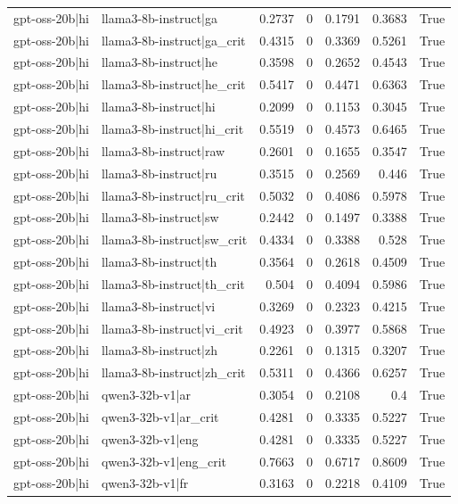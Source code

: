 \begin{table}
\begin{tabular}{l l r r r r l}
gpt-oss-20b|hi & llama3-8b-instruct|ga & 0.2737 & 0 & 0.1791 & 0.3683 & True \\
gpt-oss-20b|hi & llama3-8b-instruct|ga_crit & 0.4315 & 0 & 0.3369 & 0.5261 & True \\
gpt-oss-20b|hi & llama3-8b-instruct|he & 0.3598 & 0 & 0.2652 & 0.4543 & True \\
gpt-oss-20b|hi & llama3-8b-instruct|he_crit & 0.5417 & 0 & 0.4471 & 0.6363 & True \\
gpt-oss-20b|hi & llama3-8b-instruct|hi & 0.2099 & 0 & 0.1153 & 0.3045 & True \\
gpt-oss-20b|hi & llama3-8b-instruct|hi_crit & 0.5519 & 0 & 0.4573 & 0.6465 & True \\
gpt-oss-20b|hi & llama3-8b-instruct|raw & 0.2601 & 0 & 0.1655 & 0.3547 & True \\
gpt-oss-20b|hi & llama3-8b-instruct|ru & 0.3515 & 0 & 0.2569 & 0.446 & True \\
gpt-oss-20b|hi & llama3-8b-instruct|ru_crit & 0.5032 & 0 & 0.4086 & 0.5978 & True \\
gpt-oss-20b|hi & llama3-8b-instruct|sw & 0.2442 & 0 & 0.1497 & 0.3388 & True \\
gpt-oss-20b|hi & llama3-8b-instruct|sw_crit & 0.4334 & 0 & 0.3388 & 0.528 & True \\
gpt-oss-20b|hi & llama3-8b-instruct|th & 0.3564 & 0 & 0.2618 & 0.4509 & True \\
gpt-oss-20b|hi & llama3-8b-instruct|th_crit & 0.504 & 0 & 0.4094 & 0.5986 & True \\
gpt-oss-20b|hi & llama3-8b-instruct|vi & 0.3269 & 0 & 0.2323 & 0.4215 & True \\
gpt-oss-20b|hi & llama3-8b-instruct|vi_crit & 0.4923 & 0 & 0.3977 & 0.5868 & True \\
gpt-oss-20b|hi & llama3-8b-instruct|zh & 0.2261 & 0 & 0.1315 & 0.3207 & True \\
gpt-oss-20b|hi & llama3-8b-instruct|zh_crit & 0.5311 & 0 & 0.4366 & 0.6257 & True \\
gpt-oss-20b|hi & qwen3-32b-v1|ar & 0.3054 & 0 & 0.2108 & 0.4 & True \\
gpt-oss-20b|hi & qwen3-32b-v1|ar_crit & 0.4281 & 0 & 0.3335 & 0.5227 & True \\
gpt-oss-20b|hi & qwen3-32b-v1|eng & 0.4281 & 0 & 0.3335 & 0.5227 & True \\
gpt-oss-20b|hi & qwen3-32b-v1|eng_crit & 0.7663 & 0 & 0.6717 & 0.8609 & True \\
gpt-oss-20b|hi & qwen3-32b-v1|fr & 0.3163 & 0 & 0.2218 & 0.4109 & True \\

\end{tabular}
\end{table}
